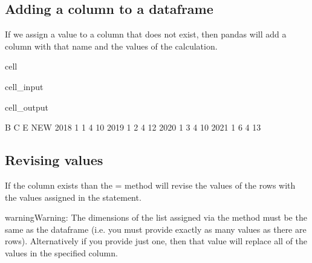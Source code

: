 \documentclass[letterpaper,10pt,english]{jupyterBook}
\begin{document}
\subsection{Adding a column to a dataframe}
\label{\detokenize{content/04_PythonEssentials/PythonPackagesEtc:adding-a-column-to-a-dataframe}}
\sphinxAtStartPar
If we assign a value to a column that does not exist, then pandas will add a column with that name and the values of the calculation.

\begin{sphinxuseclass}{cell}\begin{sphinxVerbatimInput}

\begin{sphinxuseclass}{cell_input}
\begin{sphinxVerbatim}[commandchars=\\\{\}]
\PYG{p}{[}\PYG{p}{]}\PYG{p}{[}\PYG{p}{]}
\end{sphinxVerbatim}

\end{sphinxuseclass}\end{sphinxVerbatimInput}
\begin{sphinxVerbatimOutput}

\begin{sphinxuseclass}{cell_output}
\begin{sphinxVerbatim}[commandchars=\\\{\}]
      B  C  E  NEW
2018  1  1  4   10
2019  1  2  4   12
2020  1  3  4   10
2021  1  6  4   13
\end{sphinxVerbatim}

\end{sphinxuseclass}\end{sphinxVerbatimOutput}

\end{sphinxuseclass}

\subsection{Revising values}
\label{\detokenize{content/04_PythonEssentials/PythonPackagesEtc:revising-values}}
\sphinxAtStartPar
If the column exists than the = method will revise the values of the rows with the values assigned in the statement.

\begin{sphinxadmonition}{warning}{Warning:}
\sphinxAtStartPar
The dimensions of the list assigned via the \sphinxcode{\sphinxupquote{=}} method must be the same as the dataframe (i.e. you must provide exactly as many values as there are rows).  Alternatively if you provide just one, then that value will replace all of the values in the specified column.
\end{sphinxadmonition}
\end{document}
